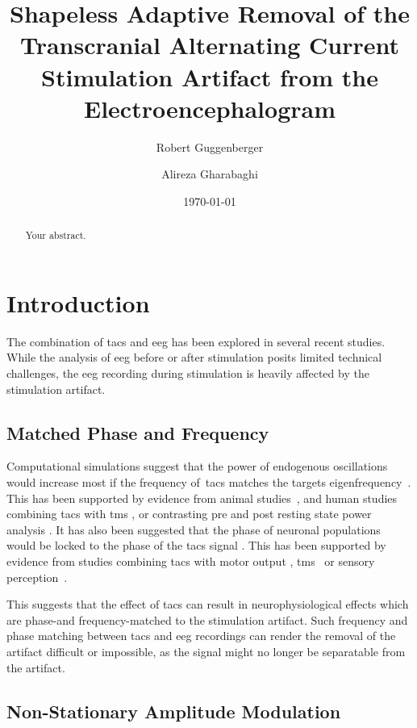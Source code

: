 \documentclass[a4paper]{article}
\title{Shapeless Adaptive Removal of the Transcranial Alternating Current Stimulation Artifact from the Electroencephalogram}
\author[1,*]{Robert Guggenberger}
\author[1]{Alireza Gharabaghi}
\affil[1]{Department for Translational Neurosurgery, University Hospital Tübingen}
\affil[*]{Corresponding author: \email{robert.guggenberger@posteo.eu}}
\date{\today}
\begin{document}
\maketitle
\thispagestyle{fancy}

\begin{abstract}
Your abstract.
\end{abstract}

\section{Introduction}

The combination of \gls{tacs} and \gls{eeg} has been explored in several recent studies. While the analysis of \gls{eeg} before or after stimulation posits limited technical challenges, the \gls{eeg} recording during stimulation is heavily affected by the stimulation artifact.

\subsection{Matched Phase and Frequency}
Computational simulations suggest that the power of endogenous oscillations would increase most if the frequency of~\gls{tacs} matches the targets eigenfrequency~\citep{Kutchko_2013,Zaehle_2010}.
This has been supported by evidence from animal studies~\citep{Schmidt_2014}, and human studies combining \gls{tacs} with \gls{tms} \citep{Guerra_2016}, or contrasting pre and post resting state power analysis \citep{Zaehle_2010}.
It has also been suggested that the phase of neuronal populations would be locked to the phase of the \gls{tacs} signal \citep{Reato_2013}. This has been supported by evidence from studies combining \gls{tacs} with motor output \citep{Brittain_2013}, \gls{tms}~\citep{Raco_2016,Nakazono_2016} or sensory perception~\citep{Gundlach_2016}.

This suggests that the effect of \gls{tacs} can result in neurophysiological effects which are phase-and frequency-matched to the stimulation artifact. Such frequency and phase matching between \gls{tacs} and \gls{eeg} recordings can render the removal of the artifact difficult or impossible, as the signal might no longer be separatable from the artifact.

\subsection{Non-Stationary Amplitude Modulation}
\end{document}
